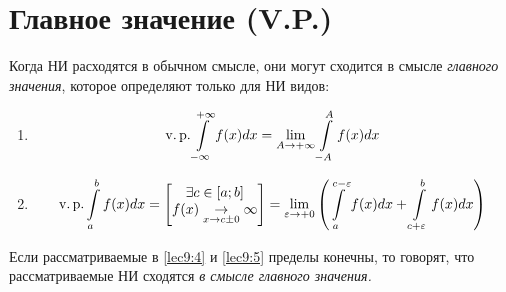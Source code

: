 \documentclass[../../main.tex]{subfiles}
\begin{document}
\section{Главное значение (V.P.)}
Когда НИ расходятся в обычном смысле, они могут сходится в смысле 
\emph{главного
значения}, которое определяют только для НИ видов:
\begin{enumerate}
\item  \begin{equation}
\label{lec9:4} \operatorname{v.p.}
\int\limits_{-\infty}^{+\infty} f(x) dx = 
\lim\limits_{A \to +\infty} \int\limits_{-A}^A f(x)dx
\end{equation}
\item \begin{equation}
\label{lec9:5} \operatorname{v.p.}
\int\limits_a^b f(x) dx = \begin{bmatrix}
	\exists c \in \left[a; b\right]\\
	f(x) \underset{x \to c \pm 0}{\to} \infty
\end{bmatrix} =
\lim\limits_{\varepsilon \to +0} \left(
\int\limits_a^{c - \varepsilon} f(x) dx + 
\int\limits_{c + \varepsilon}^b f(x) dx
\right)
\end{equation} 
\end{enumerate}

Если рассматриваемые в \eqref{lec9:4} и \eqref{lec9:5} пределы конечны, то
говорят, что рассматриваемые НИ сходятся \emph{в смысле главного значения.}
\end{document}
